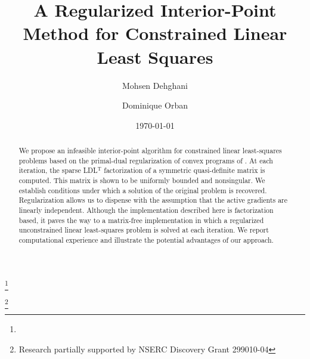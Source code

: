 \documentclass{amsart}
\begin{document}
\title[Regularized Constrained Least Squares]{%
  A Regularized Interior-Point Method for Constrained Linear Least Squares
}

\author[M. Dehghani]{Mohsen Dehghani}
\address{%
  GERAD, Montr\'eal, Canada
}
\thanks{}

\author[D. Orban]{Dominique Orban}
\address{%
  GERAD and
  Mathematics and Industrial Engineering Department \\
  \'Ecole Polytechnique, Montr\'eal, Canada
}
\thanks{Research partially supported by NSERC Discovery Grant 299010-04}



\date{\today}

\begin{abstract}
  We propose an infeasible interior-point algorithm for constrained linear
  least-squares problems based on the primal-dual regularization of convex
  programs of \cite{friedlander-orban-2012}. At each iteration, the sparse
  LDL${}^{\mathrm{T}}$ factorization of a symmetric quasi-definite matrix is
  computed. This  matrix is shown to be uniformly bounded and
  nonsingular. We establish conditions under which a solution of the original
  problem is recovered. Regularization allows us to dispense with the
  assumption that the active gradients are linearly independent. Although the
  implementation described here is factorization based, it paves the way to a
  matrix-free implementation in which a regularized unconstrained linear
  least-squares problem is solved at each iteration. We report computational
  experience and illustrate the potential advantages of our approach.
\end{abstract}

\pagestyle{myheadings}

\maketitle

\end{document}
